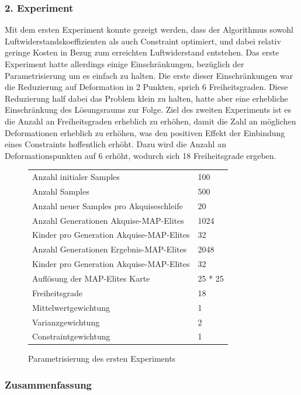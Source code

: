 \subsubsection{2. Experiment}

Mit dem ersten Experiment konnte gezeigt werden, dass der Algorithmus sowohl Luftwiderstandskoeffizienten als auch Constraint optimiert, und dabei relativ geringe Kosten in Bezug zum erreichten Luftwiderstand entstehen.
Das erste Experiment hatte allerdings einige Einschränkungen, bezüglich der Parametrisierung um es einfach zu halten.
Die erste dieser Einschränkungen war die Reduzierung auf Deformation in 2 Punkten, sprich 6 Freiheitsgraden.
Diese Reduzierung half dabei das Problem klein zu halten, hatte aber eine erhebliche Einschränkung des Lösungsraums zur Folge.
Ziel des zweiten Experiments ist es die Anzahl an Freiheitsgraden erheblich zu erhöhen, damit die Zahl an möglichen Deformationen erheblich zu erhöhen, was den positiven Effekt der Einbindung eines Constraints hoffentlich erhöht.
Dazu wird die Anzahl an Deformationspunkten auf 6 erhöht, wodurch sich 18 Freiheitsgrade ergeben.

\begin{figure}[h]
	\centering
	\begin{tabularx}{.75\textwidth}{ll}\hline
		Anzahl initialer Samples & 100 \\
		Anzahl Samples & 500 \\
		Anzahl neuer Samples pro Akquiseschleife & 20 \\
		Anzahl Generationen Akquise-MAP-Elites & 1024 \\
		Kinder pro Generation Akquise-MAP-Elites & 32 \\
		Anzahl Generationen Ergebnis-MAP-Elites & 2048 \\
		Kinder pro Generation Akquise-MAP-Elites & 32 \\
		Auflösung der MAP-Elites Karte & 25 * 25  \\
		\hline
		Freiheitsgrade & 18 \\
		Mittelwertgewichtung & 1 \\
		Varianzgewichtung & 2 \\
		Constraintgewichtung & 1 \\
	\end{tabularx}
	\label{tab:param1st}
	\caption{Parametrisierung des ersten Experiments}
\end{figure}

\subsubsection{Zusammenfassung}


